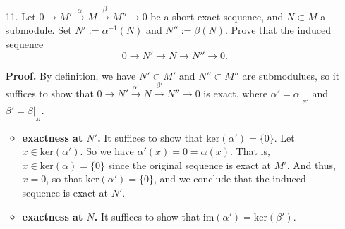 \documentclass[9pt]{article}
\begin{document}
\begin{enumerate}
   \item[11.]  Let $0 \rightarrow M' \stackrel{\alpha}{\longrightarrow} M
               \stackrel{\beta}{\longrightarrow} M'' \rightarrow 0$ be a
               short exact sequence, and $N \subset M$ a submodule. Set
               $N' := \alpha^{-1}(N)$ and $N'' := \beta(N)$. Prove that the
               induced sequence
               $$0 \rightarrow N' \rightarrow N \rightarrow N'' \rightarrow 0.$$

      \textbf{Proof.} By definition, we have $N' \subset M'$ and
      $N'' \subset M''$ are submodulues, so it suffices to show that
      $0 \rightarrow N' \stackrel{\alpha'}{\longrightarrow} N
      \stackrel{\beta'}{\longrightarrow}N'' \rightarrow 0$ is exact, where
      $\alpha' = \alpha|_{_{N'}}$ and $\beta' = \beta|_{_{M}}$.

      \begin{itemize}
         \item \textbf{exactness at $N'$.} It suffices to show that
               $\text{ker}(\alpha') = \{0\}$. Let $x \in \text{ker}(\alpha')$.
               So we have $\alpha'(x) = 0 = \alpha(x)$. That is,
               $x \in \text{ker}(\alpha) = \{0\}$ since the original sequence is
               exact at $M'$. And thus, $x = 0$, so that
               $\text{ker}(\alpha') = \{0\}$, and we conclude that the induced
               sequence is exact at $N'$.
         \item \textbf{exactness at $N$.} It suffices to show that
               $\text{im}(\alpha') = \text{ker}(\beta')$.
      \end{itemize}
                
\end{enumerate}
\end{document}
